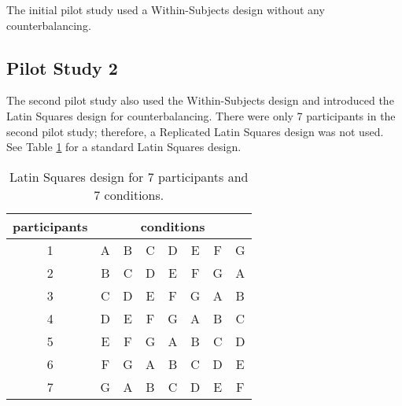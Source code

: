 The initial pilot study used a Within-Subjects design without any counterbalancing.

\subsection{Pilot Study 2}

The second pilot study also used the Within-Subjects design and introduced the Latin Squares design for counterbalancing. There were only 7 participants in the second pilot study; therefore, a Replicated Latin Squares design was not used. See Table \ref{table_latin_squares_no_reps} for a standard Latin Squares design.

\begin{table}[h] %
\centering
\caption[Latin Squares Design with No Replications]{\centering Latin Squares design for 7 participants and 7 conditions.}
\label{table_latin_squares_no_reps}
\begin{tabular}{c | c c c c c c c}
    \hline
    participants & \multicolumn{7}{c}{conditions} \\
    \hline
    1 & A & B & C & D & E & F & G \\
    2 & B & C & D & E & F & G & A \\
    3 & C & D & E & F & G & A & B \\
    4 & D & E & F & G & A & B & C \\
    5 & E & F & G & A & B & C & D \\
    6 & F & G & A & B & C & D & E \\
    7 & G & A & B & C & D & E & F \\
    \hline
\end{tabular}
\end{table}